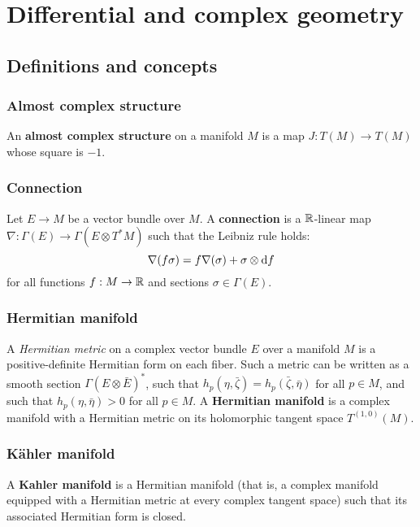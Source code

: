 \documentclass[11pt, english]{article}
\begin{document}
\section{Differential and complex geometry}
\subsection{Definitions and concepts}

\subsubsection{Almost complex structure}
\label{almostcomplex}

An \textbf{almost complex structure} on a manifold $M$ is a map $J:T(M) \to T(M)$ whose square is $-1$.

\subsubsection{Connection}
\label{connection}
Let $E \to M$ be a vector bundle over $M$. A \textbf{connection} is a $\mathbb{R}$-linear map $\nabla:\Gamma(E) \to \Gamma(E \otimes T^\ast M)$ such that the Leibniz rule holds:
\[
\nabla(f \sigma) = f \nabla(\sigma) + \sigma \otimes \mathrm{d}{f}
\]
for all functions $f:M \to \mathbb{R}$ and sections $\sigma \in \Gamma(E)$.

\subsubsection{Hermitian manifold}
\label{hermitianmanifold}

A \emph{Hermitian metric} on a complex vector bundle $E$ over a manifold $M$ is a positive-definite Hermitian form on each fiber. Such a metric can be written as a smooth section $\Gamma(E \otimes \bar{E})^\ast$, such that $h_p(\eta, \bar{\zeta}) = \bar{h_p\left(\zeta,\bar{\eta}\right)}$ for all $p \in M$, and such that $h_p(\eta,\bar{\eta}) > 0$ for all $p \in M$. A \textbf{Hermitian manifold} is a complex manifold with a Hermitian metric on its holomorphic tangent space $T^{(1,0)}(M)$.

\subsubsection{Kähler manifold}
\label{kahlermanifold}

A \textbf{Kahler manifold} is a Hermitian manifold (that is, a complex manifold equipped with a Hermitian metric at every complex tangent space) such that its associated Hermitian form is closed.
\end{document}
